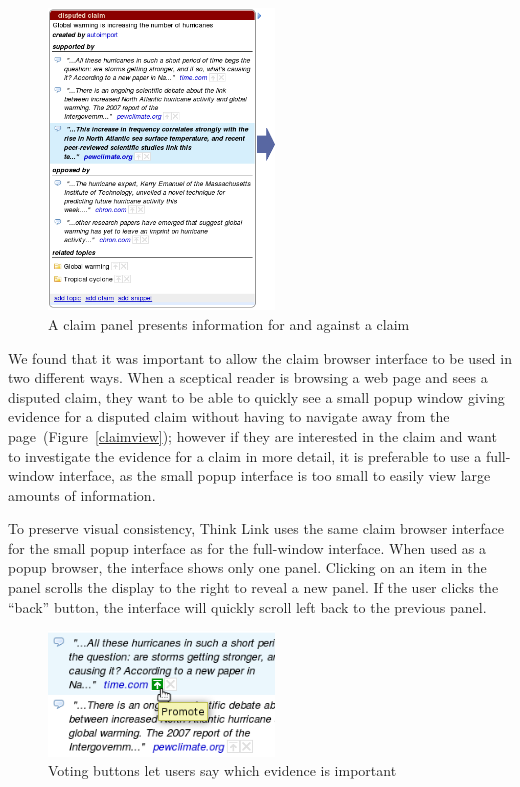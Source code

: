\documentclass{chi2009}
\newcommand{\todo}[1]{}
\begin{document}
\todo{Remove ``related`` fom the topics list - confuses with related claims}
\todo{Show the other panels?}

\begin{figure}[tb]
	\begin{center}
	\includegraphics[width=6cm]{../screenshots/v2_panel.png}
	\caption{A claim panel presents information for and against a claim}
	\label{panel}
	\end{center}
\end{figure}

We found that it was important to allow the claim browser interface to be used in two different ways. When a sceptical reader is browsing a web page and sees a disputed claim, they want to be able to quickly see a small popup window giving evidence for a disputed claim without having to navigate away from the page~(Figure~\ref{claimview}); however if they are interested in the claim and want to investigate the evidence for a claim in more detail, it is preferable to use a full-window interface, as the small popup interface is too small to easily view large amounts of information.

To preserve visual consistency, Think Link uses the same claim browser interface for the small popup interface as for the full-window interface. When used as a popup browser, the interface shows only one panel. Clicking on an item in the panel scrolls the display to the right to reveal a new panel. If the user clicks the ``back'' button, the interface will quickly scroll left back to the previous panel.

\begin{figure}[tb]
	\begin{center}
	\includegraphics[width=6cm]{../screenshots/v2_vote.png}
	\caption{Voting buttons let users say which evidence is important}
	\label{voting}
	\end{center}
\end{figure}
\end{document}
